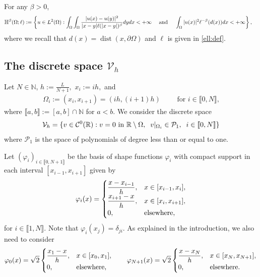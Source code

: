 \documentclass[10 pt]{article}
\newcommand\inter[1]{\llbracket #1\rrbracket}
\numberwithin{equation}{section}
\newcommand{\weH}[1]{\mathbb H^{#1}(\Omega;\ell)}
\def\R{\mathbb{R}}
\begin{document}
For any $\beta>0$,
%
\begin{align}
    \weH{\beta}&:=\left\{ u\in L^2(\Omega): \int_{\Omega}\int_{\Omega}\frac{|u(x)-u(y)|^2}{|x-y|\ell(|x-y|)^{\beta}}dydx<+\infty \quad\textnormal{ and }\quad  \int_{\Omega}|u(x)|^2\ell^{-\beta}(d(x))dx <+\infty\right\},\label{H:weights:def}
\end{align}
where we recall that $d(x)=\operatorname{dist}(x,\partial \Omega)$ and $\ell$ is given in \eqref{ell:def}.


\subsection{The discrete space $\mathcal V_h$}

Let $N\in \mathbb N$, $h:=\frac{L}{N+1},$ $x_i:=ih,$ and 
\begin{align*}
\Omega_i:=(x_i,x_{i+1})=(ih,(i+1)h)\qquad \text{ for $i\in\inter{0,N}$,}
\end{align*}
where $\inter{a,b}:=[a,b]\cap\mathbb{N}$ for $a<b$. We consider the discrete space
%
\begin{equation}\label{Vh:def}
    \mathcal V_h=\{v\in \mathcal C^0(\R): v=0 \textnormal{ in } \R\setminus \Omega, \;\; v|_{\Omega_i}\in \mathcal P_1, \;\;  i\in\inter{0,N}\}
\end{equation}
%
where $\mathcal P_1$ is the space of polynomials of degree less than or equal to one. 

Let $(\varphi_i)_{i\in\inter{0,N+1}}$ be the basis of shape functions $\varphi_i$ with compact support in each interval $[x_{i-1},x_{i+1}]$ given by
%
\begin{align}\label{eq:def_basis}
 \varphi_i(x)=\begin{cases}
        \displaystyle \frac{x-x_{i-1}}{h}, &x\in[x_{i-1},x_i], \\
        \displaystyle \frac{x_{i+1}-x}{h}, &x\in [x_i,x_{i+1}], \\
        0, &\textnormal{elsewhere},
    \end{cases}
\end{align}
for $i\in\inter{1,N}$.  Note that $\varphi_i(x_j)=\delta_{ji}$.  As explained in the introduction, we also need to consider 
%
\begin{align}\label{eq:def_basis_ext}
    \varphi_0(x)=\sqrt{2}\begin{cases}
        \displaystyle \frac{x_{1}-x}{h}, &x\in [x_0,x_{1}], \\
        0, &\textnormal{elsewhere},
    \end{cases} \qquad \varphi_{N+1}(x)=\sqrt{2}\begin{cases}
        \displaystyle \frac{x-x_{N}}{h}, &x\in[x_{N},x_{N+1}], \\
        0, &\textnormal{elsewhere.}
    \end{cases}
\end{align}
%
\end{document}

